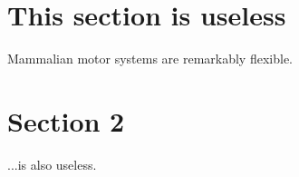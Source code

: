 \documentclass[a4paper]{article}
\begin{document}
\maketitle


\section{This section is useless}

Mammalian motor systems are remarkably flexible.


\section{Section 2}

...is also useless.


% 
% 
\end{document}
